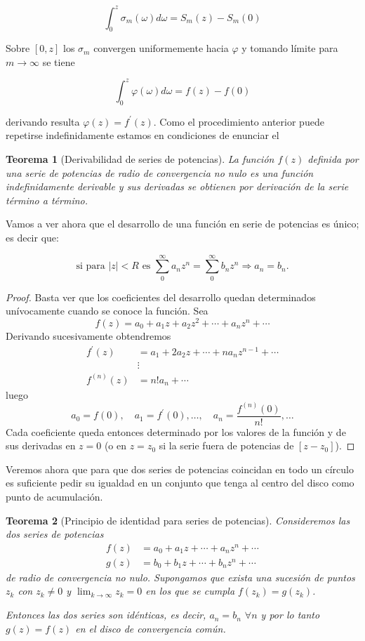 \documentclass[10pt]{article}
\theoremstyle{plain}
\newtheorem{theorem}{Teorema}[section]
\theoremstyle{definition}
\theoremstyle{remark}
\begin{document}
$$
\int_{0}^{z} \sigma_{m}(\omega) d \omega=S_{m}(z)-S_{m}(0)
$$

Sobre $[0, z]$ los $\sigma_{m}$ convergen uniformemente hacia $\varphi$ y tomando límite para $m \rightarrow \infty$ se tiene

$$
\int_{0}^{z} \varphi(\omega) d \omega=f(z)-f(0)
$$

derivando resulta $\varphi(z)=f^{\prime}(z)$. Como el procedimiento anterior puede repetirse indefinidamente estamos en condiciones de enunciar el

\begin{theorem}[Derivabilidad de series de potencias]
La función $f(z)$ definida por una serie de potencias de radio de convergencia no nulo es una función indefinidamente derivable y sus derivadas se obtienen por derivación de la serie término a término.
\end{theorem}

Vamos a ver ahora que el desarrollo de una función en serie de potencias es único; es decir que:

\begin{equation*}
\text{si para }|z|<R \text{ es } \sum_{0}^{\infty} a_{n} z^{n}=\sum_{0}^{\infty} b_{n} z^{n} \Rightarrow a_{n}=b_{n} . \tag{10-2}
\end{equation*}

\begin{proof}
Basta ver que los coeficientes del desarrollo quedan determinados unívocamente cuando se conoce la función. Sea
$$f(z)=a_{0}+a_{1} z+a_{2} z^{2}+\cdots+a_{n} z^{n}+\cdots$$
Derivando sucesivamente obtendremos
$$\begin{aligned}
f^{\prime}(z) &= a_{1}+2 a_{2} z+\cdots+n a_{n} z^{n-1}+\cdots \\
&\vdots \\
f^{(n)}(z) &= n!a_{n}+\cdots
\end{aligned}$$
luego
$$a_{0}=f(0), \quad a_{1}=f^{\prime}(0), \ldots, \quad a_{n}=\frac{f^{(n)}(0)}{n!}, \ldots$$
Cada coeficiente queda entonces determinado por los valores de la función y de sus derivadas en $z=0$ (o en $z=z_{0}$ si la serie fuera de potencias de $[z-z_{0}]$).
\end{proof}

Veremos ahora que para que dos series de potencias coincidan en todo un círculo es suficiente pedir su igualdad en un conjunto que tenga al centro del disco como punto de acumulación.

\begin{theorem}[Principio de identidad para series de potencias]
Consideremos las dos series de potencias
$$\begin{aligned}
f(z) &= a_{0}+a_{1} z+\cdots+a_{n} z^{n}+\cdots \\
g(z) &= b_{0}+b_{1} z+\cdots+b_{n} z^{n}+\cdots
\end{aligned}$$
de radio de convergencia no nulo. Supongamos que exista una sucesión de puntos $z_k$ con $z_k \neq 0$ y $\lim_{k \rightarrow \infty} z_k=0$ en los que se cumpla $f(z_k)=g(z_k)$.

Entonces las dos series son idénticas, es decir, $a_n=b_n$ $\forall n$ y por lo tanto $g(z)=f(z)$ en el disco de convergencia común.
\end{theorem}
\end{document}
